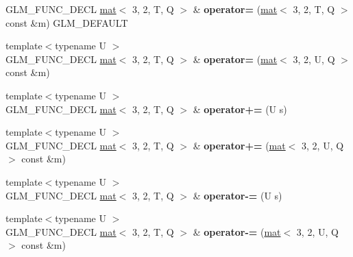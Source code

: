 \begin{DoxyCompactItemize}
\mbox{\label{structglm_1_1mat_3_013_00_012_00_01T_00_01Q_01_4_a87731f06ebf685779a526d0d7c62c791}} 
G\+L\+M\+\_\+\+F\+U\+N\+C\+\_\+\+D\+E\+CL \hyperlink{structglm_1_1mat}{mat}$<$ 3, 2, T, Q $>$ \& {\bfseries operator=} (\hyperlink{structglm_1_1mat}{mat}$<$ 3, 2, T, Q $>$ const \&m) G\+L\+M\+\_\+\+D\+E\+F\+A\+U\+LT
\item 
\mbox{\label{structglm_1_1mat_3_013_00_012_00_01T_00_01Q_01_4_a65727ccee2a0fa43de9786b68c03120d}} 
{\footnotesize template$<$typename U $>$ }\\G\+L\+M\+\_\+\+F\+U\+N\+C\+\_\+\+D\+E\+CL \hyperlink{structglm_1_1mat}{mat}$<$ 3, 2, T, Q $>$ \& {\bfseries operator=} (\hyperlink{structglm_1_1mat}{mat}$<$ 3, 2, U, Q $>$ const \&m)
\item 
\mbox{\label{structglm_1_1mat_3_013_00_012_00_01T_00_01Q_01_4_a2f7849a67991389dab2de4945f67f1f9}} 
{\footnotesize template$<$typename U $>$ }\\G\+L\+M\+\_\+\+F\+U\+N\+C\+\_\+\+D\+E\+CL \hyperlink{structglm_1_1mat}{mat}$<$ 3, 2, T, Q $>$ \& {\bfseries operator+=} (U s)
\item 
\mbox{\label{structglm_1_1mat_3_013_00_012_00_01T_00_01Q_01_4_abf135c2584e5a5fcdaff6488d353d0fe}} 
{\footnotesize template$<$typename U $>$ }\\G\+L\+M\+\_\+\+F\+U\+N\+C\+\_\+\+D\+E\+CL \hyperlink{structglm_1_1mat}{mat}$<$ 3, 2, T, Q $>$ \& {\bfseries operator+=} (\hyperlink{structglm_1_1mat}{mat}$<$ 3, 2, U, Q $>$ const \&m)
\item 
\mbox{\label{structglm_1_1mat_3_013_00_012_00_01T_00_01Q_01_4_a0ab9b96cc625abbf3ecec33240d5db7e}} 
{\footnotesize template$<$typename U $>$ }\\G\+L\+M\+\_\+\+F\+U\+N\+C\+\_\+\+D\+E\+CL \hyperlink{structglm_1_1mat}{mat}$<$ 3, 2, T, Q $>$ \& {\bfseries operator-\/=} (U s)
\item 
\mbox{\label{structglm_1_1mat_3_013_00_012_00_01T_00_01Q_01_4_a5f0d9bcf7905c11160d68dbb173b1f19}} 
{\footnotesize template$<$typename U $>$ }\\G\+L\+M\+\_\+\+F\+U\+N\+C\+\_\+\+D\+E\+CL \hyperlink{structglm_1_1mat}{mat}$<$ 3, 2, T, Q $>$ \& {\bfseries operator-\/=} (\hyperlink{structglm_1_1mat}{mat}$<$ 3, 2, U, Q $>$ const \&m)

\end{DoxyCompactItemize}
